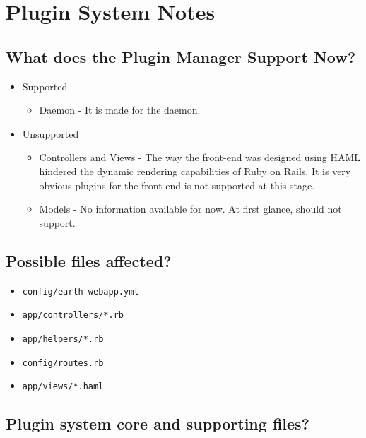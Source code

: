 \documentclass{article}
\begin{document}
\section*{Plugin System Notes}

\subsection*{What does the Plugin Manager Support Now?}

\begin{itemize}
	\item Supported
		\begin{itemize}
			\item Daemon - It is made for the daemon.
		\end{itemize}
	\item Unsupported
		\begin{itemize}
			\item Controllers and Views - The way the front-end was designed using HAML hindered the dynamic rendering capabilities of Ruby on Rails. It is very obvious plugins for the front-end is not supported at this stage. 
			\item Models - No information available for now. At first glance, should not support.
		\end{itemize}
\end{itemize}

\subsection*{Possible files affected?}

\begin{itemize}
	\item \texttt{config/earth-webapp.yml}
	\item \texttt{app/controllers/*.rb}
	\item \texttt{app/helpers/*.rb}
	\item \texttt{config/routes.rb}
	\item \texttt{app/views/*.haml}
\end{itemize}

\subsection*{Plugin system core and supporting files?}
\end{document}
